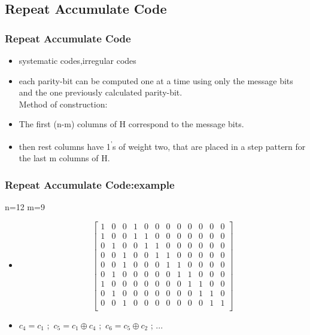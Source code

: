 \documentclass[xcolor=dvipsname]
{beamer}
\begin{document}
\subsection{Repeat Accumulate Code}
\begin{frame}[t] 
\frametitle{Repeat Accumulate Code}
\begin{itemize}
\item systematic codes,irregular codes
 \item  each parity-bit can be computed  one  at  a  time  using  only  the  message  bits  and  the  one  previously calculated parity-bit. 
\\ \alert{Method of construction:}
\item The first (n-m) columns of H correspond to the message bits.
\item then rest columns have  1\textsuperscript{'}s of weight two, that are placed in a step pattern for the last m columns of H.
 
\end{itemize}         
\end{frame}

\begin{frame}[t] 
\frametitle{Repeat Accumulate Code:example}
 n=12 m=9
 \begin{itemize}
 \item  
  \[
 \left[ \begin{array}{cccccccccccc}
1 & 0 & 0 & 1 & 0 & 0 & 0 & 0 & 0 & 0 & 0 & 0 \\
1 & 0 & 0 & 1 & 1 & 0 & 0 & 0 & 0 & 0 & 0 & 0 \\
0 & 1 & 0 & 0 & 1 & 1 & 0 & 0 & 0 & 0 & 0 & 0 \\
0 & 0 & 1 & 0 & 0 & 1 & 1 & 0 & 0 & 0 & 0 & 0 \\
0 & 0 & 1 & 0 & 0 & 0 & 1 & 1 & 0 & 0 & 0 & 0 \\
0 & 1 & 0 & 0 & 0 & 0 & 0 & 1 & 1 & 0 & 0 & 0\\
1 & 0 & 0 & 0 & 0 & 0 & 0 & 0 & 1 & 1 & 0 & 0 \\
0 & 1 & 0 & 0 & 0 & 0 & 0 & 0 & 0 & 1 & 1 & 0 \\
0 & 0 & 1 & 0 & 0 & 0 & 0 & 0 & 0 & 0 & 1 & 1 \\ \end{array} \right]  
\] 
 \item $c_4 = c_1$ ;\ $c_5 = c_1 \oplus c_4$ ;\ $c_6 = c_5 \oplus c_2$ ; ...\
 \end{itemize}
\end{frame}
\end{document}
